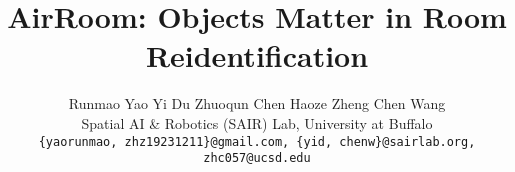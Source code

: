 \documentclass[10pt,twocolumn,letterpaper]{article}
\title{AirRoom: Objects Matter in Room Reidentification}
\author{
Runmao Yao \quad
Yi Du \quad
Zhuoqun Chen \quad
Haoze Zheng \quad
Chen Wang \\
Spatial AI \& Robotics (SAIR) Lab, University at Buffalo \\
{\tt\small \{yaorunmao, zhz19231211\}@gmail.com, \{yid, chenw\}@sairlab.org, zhc057@ucsd.edu}
}
\begin{document}
\maketitle
    





% 
% 
{
    \small
    
    
}


\end{document}
